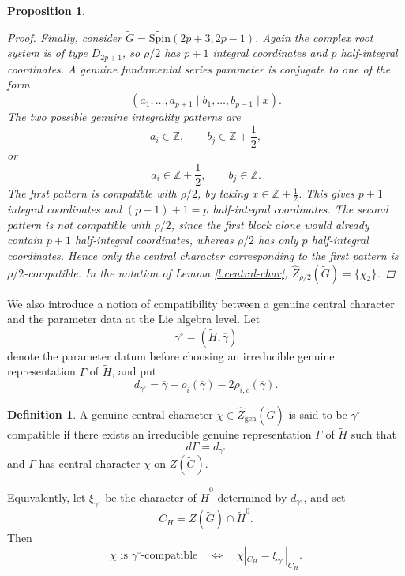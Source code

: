 \documentclass{amsart}
\newcommand{\Spin}{{\mathrm{Spin}}}
\newtheorem{prop}[thm]{Proposition}
\theoremstyle{definition}
\newtheorem{definition}[thm]{Definition}
\newcommand{\tu}{\widetilde}
\begin{document}
\begin{prop}
\begin{proof}
Finally, consider $\widetilde G=\widetilde{\Spin}(2p+3,2p-1)$. Again the complex root system is of type $D_{2p+1}$, so $\rho/2$ has $p+1$ integral coordinates and $p$ half-integral coordinates. A genuine fundamental series parameter is conjugate to one of the form
\begin{equation*}
(a_1,\ldots,a_{p+1}\mid b_1,\ldots,b_{p-1}\mid x).
\end{equation*}
The two possible genuine integrality patterns are
\begin{equation*}
a_i\in\mathbb Z,\qquad b_j\in\mathbb Z+\frac12,
\end{equation*}
or
\begin{equation*}
a_i\in\mathbb Z+\frac12,\qquad b_j\in\mathbb Z.
\end{equation*}
The first pattern is compatible with $\rho/2$, by taking $x\in\mathbb Z+\frac12$. This gives $p+1$ integral coordinates and $(p-1)+1=p$ half-integral coordinates. The second pattern is not compatible with $\rho/2$, since the first block alone would already contain $p+1$ half-integral coordinates, whereas $\rho/2$ has only $p$ half-integral coordinates. Hence only the central character corresponding to the first pattern is $\rho/2$-compatible. In the notation of Lemma \ref{l:central-char}, 
 $\widehat Z_{\rho/2}(\widetilde G)=\{\chi_2\}$.
\end{proof}

\end{prop}





We also introduce a notion of compatibility between a genuine central
character and the parameter data at the Lie algebra level.  Let
\[
\gamma^\circ=(\tu H,\overline\gamma)
\]
denote the parameter datum before choosing an irreducible genuine
representation \(\Gamma\) of \(\tu H\), and put
\[
d_{\gamma^\circ}
=
\overline\gamma
+\rho_i(\overline\gamma)
-2\rho_{i,c}(\overline\gamma).
\]

\begin{definition}\label{d:gamma-compatible}
A genuine central character
$\chi\in\widehat Z_{\mathrm{gen}}(\tu G)$
is said to be \(\gamma^\circ\)-compatible if there exists an
irreducible genuine representation \(\Gamma\) of \(\tu H\) such that
\[
d\Gamma=d_{\gamma^\circ}
\]
and \(\Gamma\) has central character \(\chi\) on \(Z(\tu G)\).

Equivalently, let \(\xi_{\gamma^\circ}\) be the character of
\(\tu H^0\) determined by \(d_{\gamma^\circ}\), and set
\[
C_H=Z(\tu G)\cap\tu H^0.
\]
Then
\[
\chi\text{ is \(\gamma^\circ\)-compatible}
\quad\Longleftrightarrow\quad
\chi|_{C_H}
=
\xi_{\gamma^\circ}|_{C_H}.
\]
\end{definition}
\end{document}
